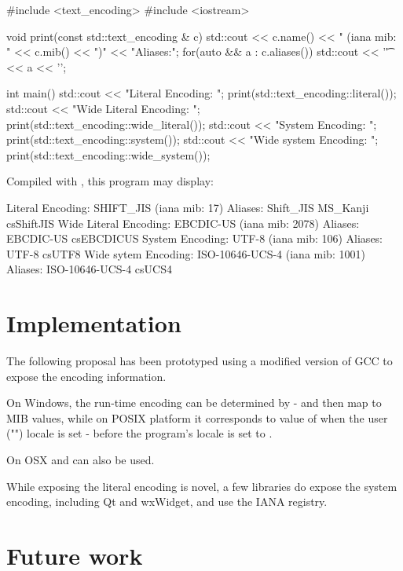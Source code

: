 \documentclass{wg21}
\begin{document}
\begin{codeblock}

#include <text_encoding>
#include <iostream>

void print(const std::text_encoding & c) {
	std::cout << c.name()
	<< " (iana mib: " << c.mib() << ")\n"
	<< "Aliases:\n";
	for(auto && a : c.aliases()) {
		std::cout << '\t' << a << '\n';
	}
}

int main() {
	std::cout << "Literal Encoding: ";
	print(std::text_encoding::literal());
	std::cout << "Wide Literal Encoding: ";
	print(std::text_encoding::wide_literal());
	std::cout << "System Encoding: ";
	print(std::text_encoding::system());
	std::cout << "Wide system Encoding: ";
	print(std::text_encoding::wide_system());
}
\end{codeblock}

Compiled with , this program may display:

\begin{codeblock}
Literal Encoding: SHIFT_JIS (iana mib: 17)
Aliases:
	Shift_JIS
	MS_Kanji
	csShiftJIS
Wide Literal Encoding: EBCDIC-US (iana mib: 2078)
Aliases:
	EBCDIC-US
	csEBCDICUS
System Encoding: UTF-8 (iana mib: 106)
Aliases:
	UTF-8
	csUTF8
Wide sytem Encoding: ISO-10646-UCS-4 (iana mib: 1001)
Aliases:
	ISO-10646-UCS-4
	csUCS4
\end{codeblock}


\section{Implementation}

The following proposal has been prototyped using a modified version of GCC to expose the encoding information.

On Windows, the run-time encoding can be determined by  - and then map to MIB values, while on POSIX platform it corresponds to value of  when the user ("") locale is set - before the program's locale is set to .

On OSX  and  can also be used.


While exposing the literal encoding is novel, a few libraries do expose the system encoding, including Qt and wxWidget, and use the IANA registry.

\section{Future work}
\end{document}
